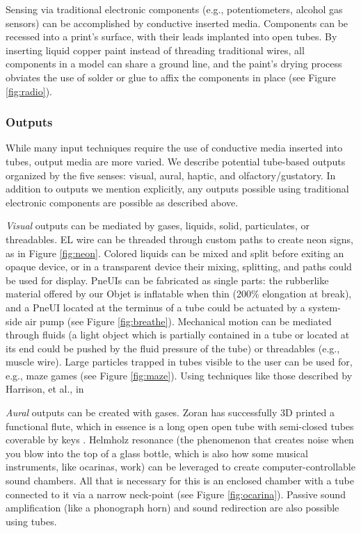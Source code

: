 Sensing via traditional electronic components (e.g., potentiometers, alcohol gas sensors) can be accomplished by conductive inserted media.  Components can be recessed into a print's surface, with their leads implanted into open tubes.  By inserting liquid copper paint instead of threading traditional wires, all components in a model can share a ground line, and the paint's drying process obviates the use of solder or glue to affix the components in place (see Figure \ref{fig:radio}).

\subsubsection{Outputs}

While many input techniques require the use of conductive media inserted into tubes, output media are more varied.  We describe potential tube-based outputs organized by the five senses: visual, aural, haptic, and olfactory/gustatory.  In addition to outputs we mention explicitly, any outputs possible using traditional electronic components are possible as described above.

\emph{Visual} outputs can be mediated by gases, liquids, solid, particulates, or threadables.  EL wire can be threaded through custom paths to create neon signs, as in Figure \ref{fig:neon}.  Colored liquids can be mixed and split before exiting an opaque device, or in a transparent device their mixing, splitting, and paths could be used for display.  PneUIs \cite{Yao-pneui} can be fabricated as single parts: the rubberlike material offered by our Objet is inflatable when thin (200\% elongation at break), and a PneUI located at the terminus of a tube could be actuated by a system-side air pump (see Figure \ref{fig:breathe}).  Mechanical motion can be mediated through fluids (a light object which is partially contained in a tube or located at its end could be pushed by the fluid pressure of the tube) or threadables (e.g., muscle wire).  Large particles trapped in tubes visible to the user can be used for, e.g., maze games (see Figure \ref{fig:maze}).  Using techniques like those described by Harrison, et al., in \cite{Harrison-buttons}  

\emph{Aural} outputs can be created with gases.  Zoran has successfully 3D printed a functional flute, which in essence is a long open open tube with semi-closed tubes coverable by keys \cite{Zoran-flute}.  Helmholz resonance (the phenomenon that creates noise when you blow into the top of a glass bottle, which is also how some musical instruments, like ocarinas, work) can be leveraged to create computer-controllable sound chambers.  All that is necessary for this is an enclosed chamber with a tube connected to it via a narrow neck-point (see Figure \ref{fig:ocarina}).  Passive sound amplification (like a phonograph horn) and sound redirection are also possible using tubes.

